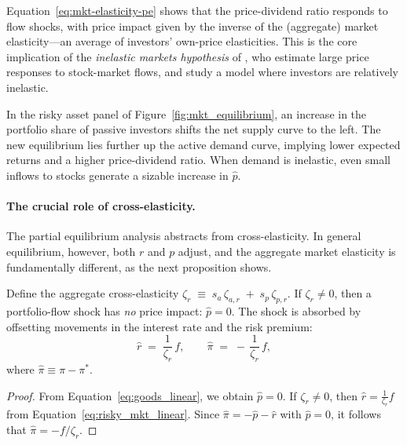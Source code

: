 Equation~\eqref{eq:mkt-elasticity-pe} shows that the price-dividend ratio responds to flow shocks, with price impact given by the inverse of the (aggregate) market elasticity---an average of investors' own-price elasticities.
This is the core implication of the \emph{inelastic markets hypothesis} of \citet{gabaix2020search}, who estimate large price responses to stock-market flows, and study a model where investors are relatively inelastic.

In the risky asset panel of Figure~\ref{fig:mkt_equilibrium}, an increase in the portfolio share of passive investors shifts the net supply curve to the left.
The new equilibrium lies further up the active demand curve, implying lower expected returns and a higher price-dividend ratio.
When demand is inelastic, even small inflows to stocks generate a sizable increase in $\hat{p}$.

\paragraph{The crucial role of cross-elasticity.}
The partial equilibrium analysis abstracts from cross-elasticity.
In general equilibrium, however, both $r$ and $p$ adjust, and the aggregate market elasticity is fundamentally different, as the next proposition shows.

\begin{prop}\label{prop:inf-elasticity}
    Define the aggregate cross-elasticity $\zeta_r \;\equiv\; s_a\,\zeta_{a,r} \;+\; s_p\,\zeta_{p,r}$.
    If $\zeta_r \neq 0$, then a portfolio-flow shock has \emph{no} price impact: $\hat p=0$.
    The shock is absorbed by offsetting movements in the interest rate and the risk premium:
    \[
        \hat r \;=\; \frac{1}{\zeta_r}\,f, 
        \qquad 
        \hat \pi \;=\; -\,\frac{1}{\zeta_r}\,f,
    \]
    where $\hat{\pi} \equiv \pi - \pi^{*}$.
\end{prop}
\begin{proof}
    From Equation~\eqref{eq:goods_linear}, we obtain $\hat{p} = 0$.
    If $\zeta_r \neq 0$, then $\hat{r} = \frac{1}{\zeta_r} f$ from Equation~\eqref{eq:risky_mkt_linear}.
    Since $\hat \pi = -\hat p - \hat r$ with $\hat p=0$, it follows that $\hat \pi = - f/\zeta_r$.
\end{proof}

